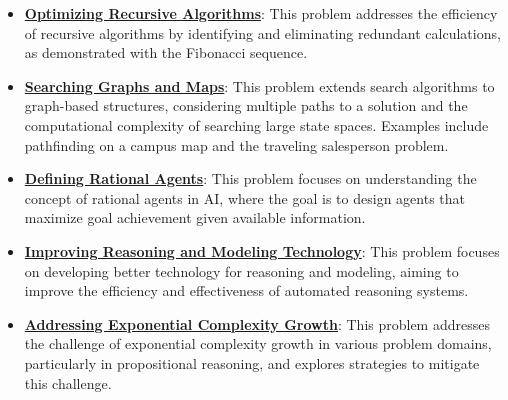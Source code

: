 \documentclass{article}%
\begin{document}
\begin{itemize}[leftmargin=*]
\item \href{https://purdue.brightspace.com/d2l/common/assets/pdfjs-d2l-dist/1.0.14-legacy/web/viewer.html?file=\%2Fcontent\%2Fenforced\%2F1095467-wl.202510.CS.24300.001\%2F14L1-DepthFS.pdf\%3Fou\%3D1095467\&lang=en-us\&container=d2l-fileviewer-rendered-pdf\&fullscreen=d2l-fileviewer-rendered-pdf-dialog\&height=667#page=21}{\textbf{Optimizing Recursive Algorithms}}: This problem addresses the efficiency of recursive algorithms by identifying and eliminating redundant calculations, as demonstrated with the Fibonacci sequence.%
\item \href{https://purdue.brightspace.com/d2l/common/assets/pdfjs-d2l-dist/1.0.14-legacy/web/viewer.html?file=\%2Fcontent\%2Fenforced\%2F1095467-wl.202510.CS.24300.001\%2F14L1-DepthFS.pdf\%3Fou\%3D1095467\&lang=en-us\&container=d2l-fileviewer-rendered-pdf\&fullscreen=d2l-fileviewer-rendered-pdf-dialog\&height=667#page=25}{\textbf{Searching Graphs and Maps}}: This problem extends search algorithms to graph-based structures, considering multiple paths to a solution and the computational complexity of searching large state spaces. Examples include pathfinding on a campus map and the traveling salesperson problem.%
\item \href{https://purdue.brightspace.com/d2l/common/assets/pdfjs-d2l-dist/1.0.14-legacy/web/viewer.html?file=\%2Fcontent\%2Fenforced\%2F1095467-wl.202510.CS.24300.001\%2F14L1-DepthFS.pdf\%3Fou\%3D1095467\&lang=en-us\&container=d2l-fileviewer-rendered-pdf\&fullscreen=d2l-fileviewer-rendered-pdf-dialog\&height=667#page=39}{\textbf{Defining Rational Agents}}: This problem focuses on understanding the concept of rational agents in AI, where the goal is to design agents that maximize goal achievement given available information.%
\item \href{https://purdue.brightspace.com/d2l/common/assets/pdfjs-d2l-dist/1.0.14-legacy/web/viewer.html?file=\%2Fcontent\%2Fenforced\%2F1095467-wl.202510.CS.24300.001\%2F15L2-SAT.pdf\%3Fou\%3D1095467\&lang=en-us\&container=d2l-fileviewer-rendered-pdf\&fullscreen=d2l-fileviewer-rendered-pdf-dialog\&height=667#page=3}{\textbf{Improving Reasoning and Modeling Technology}}: This problem focuses on developing better technology for reasoning and modeling, aiming to improve the efficiency and effectiveness of automated reasoning systems.%
\item \href{https://purdue.brightspace.com/d2l/common/assets/pdfjs-d2l-dist/1.0.14-legacy/web/viewer.html?file=\%2Fcontent\%2Fenforced\%2F1095467-wl.202510.CS.24300.001\%2F15L2-SAT.pdf\%3Fou\%3D1095467\&lang=en-us\&container=d2l-fileviewer-rendered-pdf\&fullscreen=d2l-fileviewer-rendered-pdf-dialog\&height=667#page=4}{\textbf{Addressing Exponential Complexity Growth}}: This problem addresses the challenge of exponential complexity growth in various problem domains, particularly in propositional reasoning, and explores strategies to mitigate this challenge.%

\end{itemize}
\end{document}

